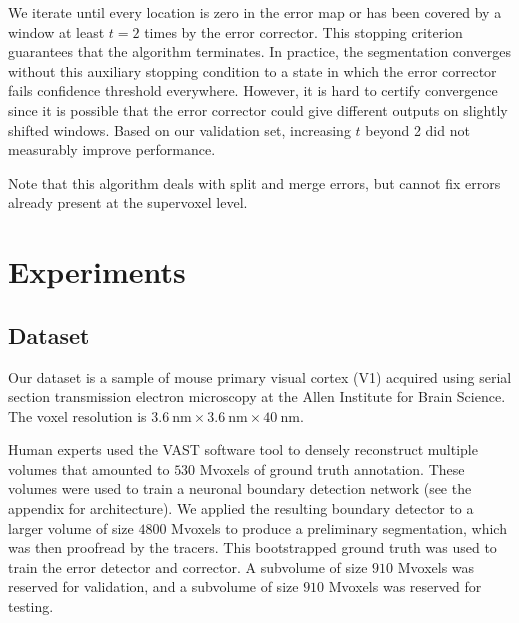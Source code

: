 \documentclass{article}
\begin{document}
We iterate until every location is zero in the error map or has been covered by a window at least $t=2$ times by the error corrector. This stopping criterion guarantees that the algorithm terminates. In practice, the segmentation converges without this auxiliary stopping condition to a state in which the error corrector fails confidence threshold everywhere. However, it is hard to certify convergence since it is possible that the error corrector could give different outputs on slightly shifted windows. Based on our validation set, increasing $t$ beyond 2 did not measurably improve performance.

Note that this algorithm deals with split and merge errors, but cannot fix errors already present at the supervoxel level.



\section{Experiments}
\subsection{Dataset}


Our dataset is a sample of mouse primary visual cortex (V1) acquired using serial section transmission electron microscopy at the Allen Institute for Brain Science. The voxel resolution is $3.6~\text{nm} \times 3.6~\text{nm} \times 40~\text{nm}$.

Human experts used the VAST software tool \cite{kasthuri2015saturated, VAST} to densely reconstruct multiple volumes that amounted to $530$ Mvoxels of ground truth annotation. These volumes were used to train a neuronal boundary detection network (see the appendix for architecture). We applied the resulting boundary detector to a larger volume of size $4800$ Mvoxels to produce a preliminary segmentation, which was then proofread by the tracers. This bootstrapped ground truth was used to train the error detector and corrector. A subvolume of size $910$ Mvoxels was reserved for validation, and a subvolume of size $910$ Mvoxels was reserved for testing.
\end{document}
